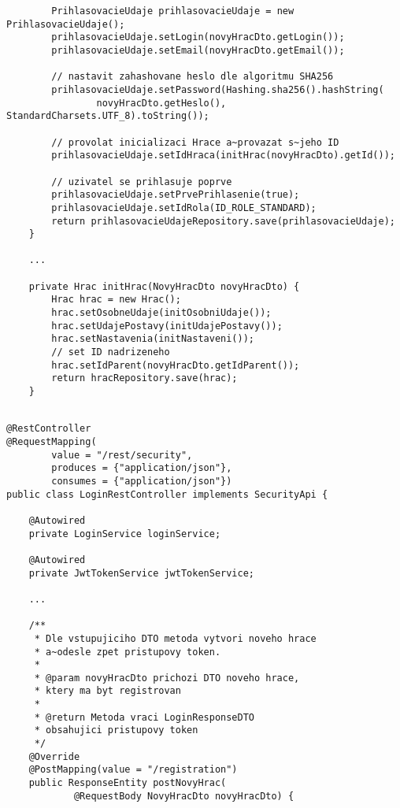 \documentclass[twoside, 12pt]{article}
\begin{document}
{{\begin{lstlisting}
        PrihlasovacieUdaje prihlasovacieUdaje = new PrihlasovacieUdaje();
        prihlasovacieUdaje.setLogin(novyHracDto.getLogin());
        prihlasovacieUdaje.setEmail(novyHracDto.getEmail());

        // nastavit zahashovane heslo dle algoritmu SHA256
        prihlasovacieUdaje.setPassword(Hashing.sha256().hashString(
                novyHracDto.getHeslo(), StandardCharsets.UTF_8).toString());

        // provolat inicializaci Hrace a~provazat s~jeho ID
        prihlasovacieUdaje.setIdHraca(initHrac(novyHracDto).getId());

        // uzivatel se prihlasuje poprve
        prihlasovacieUdaje.setPrvePrihlasenie(true);
        prihlasovacieUdaje.setIdRola(ID_ROLE_STANDARD);
        return prihlasovacieUdajeRepository.save(prihlasovacieUdaje);
    }

    ...

    private Hrac initHrac(NovyHracDto novyHracDto) {
        Hrac hrac = new Hrac();
        hrac.setOsobneUdaje(initOsobniUdaje());
        hrac.setUdajePostavy(initUdajePostavy());
        hrac.setNastavenia(initNastaveni());
        // set ID nadrizeneho
        hrac.setIdParent(novyHracDto.getIdParent());
        return hracRepository.save(hrac);
    }
\end{lstlisting}

\clearpage


\begin{lstlisting}

@RestController
@RequestMapping(
        value = "/rest/security",
        produces = {"application/json"},
        consumes = {"application/json"})
public class LoginRestController implements SecurityApi {

    @Autowired
    private LoginService loginService;

    @Autowired
    private JwtTokenService jwtTokenService;

    ...

    /**
     * Dle vstupujiciho DTO metoda vytvori noveho hrace
     * a~odesle zpet pristupovy token.
     *
     * @param novyHracDto prichozi DTO noveho hrace,
     * ktery ma byt registrovan
     *
     * @return Metoda vraci LoginResponseDTO
     * obsahujici pristupovy token
     */
    @Override
    @PostMapping(value = "/registration")
    public ResponseEntity postNovyHrac(
            @RequestBody NovyHracDto novyHracDto) {


\end{lstlisting}}}
\end{document}
